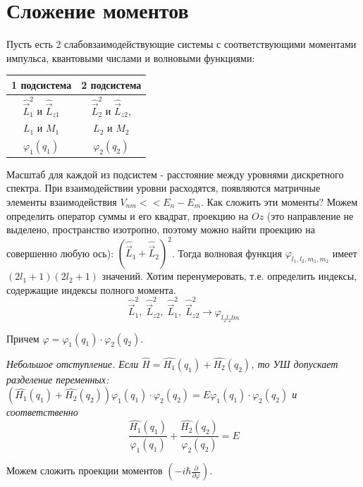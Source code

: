\newpage
\chapter{Сложение моментов}
\par Пусть есть 2 слабовзаимодействующие системы с соответствующими моментами импульса, квантовыми числами и волновыми функциями:
\begin{table}[h]
\centering
\begin{tabular}[c]{|c|c|}
\hline 
1 подсистема & 2 подсистема \\ \hline 
$\hat{\vec{L}}^2_1$ и $\hat{\vec{L}}_{z1}$ & $\hat{\vec{L}}^2_2$ и  $\hat{\vec{L}}_{z2}$,\\
$L_1$ и $M_1$ & $L_2$ и $M_2$ \\
$\varphi_1(q_1)$ & $\varphi_2(q_2)$ \\
\hline
\end{tabular}
\end{table}
\par Масштаб для каждой из подсистем - расстояние между уровнями дискретного спектра. При взаимодействии уровни расходятся, появляются матричные элементы взаимодействия  $V_{nm}<< E_n -E_m$. Как сложить эти моменты? Можем определить оператор суммы и его квадрат, проекцию на $Oz$ (это направление не выделено, пространство изотропно, поэтому можно найти проекцию на совершенно любую ось): $\left(\hat{\vec{L}}_1 +\hat{\vec{L}}_2 \right)^2$. Тогда волновая функция $\varphi_{l_1, l_2, m_1, m_2}$ имеет $(2l_1+1)(2l_2+1)$ значений. Хотим перенумеровать, т.е. определить индексы, содержащие индексы полного момента.
$$\hat{\vec{L}}^2_1,\; \hat{\vec{L}}^2_{z2},\; \hat{\vec{L}}^2_1,\; \hat{\vec{L}}^2_{z2} \longrightarrow \varphi_{l_2l_2lm}$$
\par Причем $\varphi= \varphi_1(q_1) \cdot \varphi_2(q_2)$.
\par \textit{Небольшое отступление. Если $\hat{H}=\hat{H_1}(q_1)+\hat{H_2}(q_2)$, то УШ допускает разделение переменных: $\left( \hat{H_1}(q_1)+\hat{H_2}(q_2)\right)\varphi_1(q_1) \cdot \varphi_2(q_2) = E \varphi_1(q_1) \cdot \varphi_2(q_2) $ и соответственно $$\frac{\hat{H_1}(q_1)}{\varphi_1(q_1)} +\frac{\hat{H_2}(q_2)}{ \varphi_2(q_2)} = E$$
}
\par Можем сложить проекции моментов $\left(-i \hbar \frac{\partial}{\partial \varphi} \right)$.

